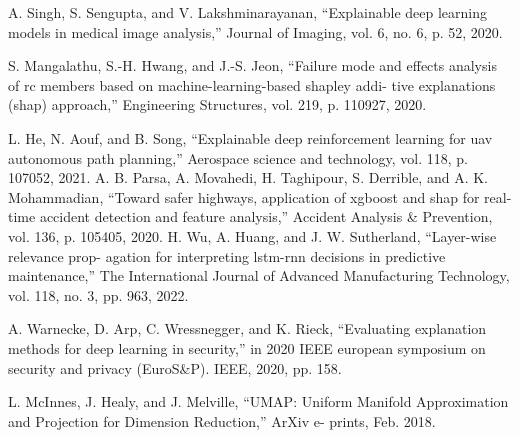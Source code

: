 \documentclass[10pt, conference, a4paper, final]{IEEEtran}
\begin{document}
\begin{thebibliography}{01}
 A. Singh, S. Sengupta, and V. Lakshminarayanan, “Explainable deep learning models in medical image analysis,” Journal of Imaging, vol. 6, no. 6, p. 52, 2020.

 S. Mangalathu, S.-H. Hwang, and J.-S. Jeon, “Failure mode and effects analysis of rc members based on machine-learning-based shapley addi- tive explanations (shap) approach,” Engineering Structures, vol. 219, p. 110927, 2020.

L. He, N. Aouf, and B. Song, “Explainable deep reinforcement learning for uav autonomous path planning,” Aerospace science and technology, vol. 118, p. 107052, 2021.
 A. B. Parsa, A. Movahedi, H. Taghipour, S. Derrible, and A. K. Mohammadian, “Toward safer highways, application of xgboost and shap for real-time accident detection and feature analysis,” Accident Analysis \& Prevention, vol. 136, p. 105405, 2020.
  H. Wu, A. Huang, and J. W. Sutherland, “Layer-wise relevance prop-
agation for interpreting lstm-rnn decisions in predictive maintenance,” The International Journal of Advanced Manufacturing Technology, vol. 118, no. 3, pp. 963, 2022.

 A. Warnecke, D. Arp, C. Wressnegger, and K. Rieck, “Evaluating explanation methods for deep learning in security,” in 2020 IEEE european symposium on security and privacy (EuroS\&P). IEEE, 2020, pp. 158.

	L. McInnes, J. Healy, and J. Melville, “UMAP: Uniform Manifold Approximation and Projection for Dimension Reduction,” ArXiv e- prints, Feb. 2018.
  
 
\end{thebibliography}
\end{document}
